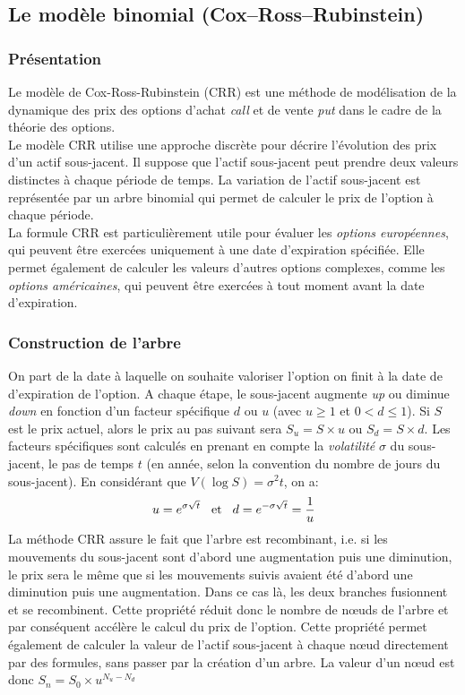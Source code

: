 \documentclass[a4paper]{article}
\begin{document}
\subsection{Le modèle binomial (Cox--Ross--Rubinstein)}
\subsubsection{Présentation}
Le modèle de Cox-Ross-Rubinstein (CRR) est une méthode de modélisation de la dynamique des prix des options d'achat \textit{call} et de vente \textit{put} dans le cadre de la théorie des options.
\vspace{2mm} \\
Le modèle CRR utilise une approche discrète pour décrire l'évolution des prix d'un actif sous-jacent. Il suppose que l'actif sous-jacent peut prendre deux valeurs distinctes à chaque période de temps. La variation de l'actif sous-jacent est représentée par un arbre binomial qui permet de calculer le prix de l'option à chaque période.
\vspace{2mm} \\
La formule CRR est particulièrement utile pour évaluer les \textit{options européennes}, qui peuvent être exercées uniquement à une date d'expiration spécifiée. Elle permet également de calculer les valeurs d'autres options complexes, comme les \textit{options américaines}, qui peuvent être exercées à tout moment avant la date d'expiration.
\subsubsection{Construction de l'arbre}
On part de la date à laquelle on souhaite valoriser l'option on finit à la date de d'expiration de l'option. A chaque étape, le sous-jacent augmente \textit{up} ou diminue \textit{down} en fonction d'un facteur spécifique $d$ ou $u$ (avec $u\geq 1$ et $0<d\leq 1$). Si $S$ est le prix actuel, alors le prix au pas suivant sera $S_u = S\times u$ ou $S_d = S\times d$. Les facteurs spécifiques sont calculés en prenant en compte la \textit{volatilité} $\sigma$ du sous-jacent, le pas de temps $t$ (en année, selon la convention du nombre de jours du sous-jacent). En considérant que $V(\log S)=\sigma ^2 t$, on a:
\begin{equation}
    u=e^{\sigma \sqrt{t}}\hspace{3mm} \text{et} \hspace{3mm} d=e^{- \sigma \sqrt{t}} = \frac{1}{u}
\end{equation}
 La méthode CRR assure le fait que l’arbre est recombinant, i.e. si les mouvements du sous-jacent sont d’abord une augmentation puis une diminution, le prix sera le même que si les mouvements suivis avaient été d’abord une diminution puis une augmentation. Dans ce cas là, les deux branches fusionnent et se recombinent. Cette propriété réduit donc le nombre de nœuds de l’arbre et par conséquent accélère le calcul du prix de l’option. Cette propriété permet également de calculer la valeur de l’actif sous-jacent à chaque nœud directement par des formules, sans passer par la création d’un arbre. La valeur d’un nœud est donc $S_n = S_0 \times u^{N_u - N_d}$
\end{document}
